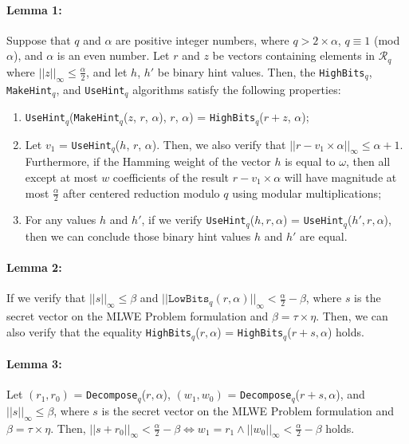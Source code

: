 \documentclass[runningheads]{llncs}
\numberwithin{equation}{section}
\begin{document}
    \paragraph{\textbf{Lemma 1:}} Suppose that $q$ and $\alpha$ are positive integer numbers, where $q > 2 \times \alpha$, $q \equiv 1$ (mod $\alpha$), and $\alpha$ is an even number. Let $r$ and $z$ be vectors containing elements in ${\mathcal{R}}_{q}$ where ${||z||}_{\infty} \leq \frac{\alpha}{2}$, and let $h$, $h'$ be binary hint values. Then, the \texttt{HighBits}${}_{q}$, \texttt{MakeHint}${}_{q}$, and \texttt{UseHint}${}_{q}$ algorithms satisfy the following properties: 
    \begin{enumerate}
        \item \texttt{UseHint}${}_{q}$(\texttt{MakeHint}${}_{q}$($z$, $r$, $\alpha$), $r$, $\alpha$) = \texttt{HighBits}${}_{q}$($r + z$, $\alpha$);
        \item Let ${v}_{1}$ = \texttt{UseHint}${}_{q}$($h$, $r$, $\alpha$). Then, we also verify that ${||r - {v}_{1} \times \alpha||}_{\infty} \leq \alpha + 1$. Furthermore, if the Hamming weight of the vector $h$ is equal to $\omega$, then all except at most $w$ coefficients of the result $r - {v}_{1} \times \alpha$ will have magnitude at most $\frac{\alpha}{2}$ after centered reduction modulo $q$ using modular multiplications;
        \item For any values $h$ and $h'$, if we verify \texttt{UseHint}${}_{q}$($h, r, \alpha$) = \texttt{UseHint}${}_{q}$($h', r, \alpha$), then we can conclude those binary hint values $h$ and $h'$ are equal.
    \end{enumerate}

    \paragraph{\textbf{Lemma 2:}} If we verify that ${||s||}_{\infty} \leq \beta$ and ${||\mathrm{\texttt{LowBits}}{}_{q}(r, \alpha)||}_{\infty} < \frac{\alpha}{2} - \beta$, where $s$ is the secret vector on the MLWE Problem formulation and $\beta = \tau \times \eta$. Then, we can also verify that the equality \texttt{HighBits}${}_{q}$($r, \alpha$) = \texttt{HighBits}${}_{q}$($r + s, \alpha$) holds.

    \paragraph{\textbf{Lemma 3:}} Let $({r}_{1}, {r}_{0})$ = \texttt{Decompose}${}_{q}$($r, \alpha$), $({w}_{1}, {w}_{0})$ = \texttt{Decompose}${}_{q}$($r + s, \alpha$), and ${||s||}_{\infty} \leq \beta$, where $s$ is the secret vector on the MLWE Problem formulation and $\beta = \tau \times \eta$. Then, ${||s + {r}_{0}||}_{\infty} < \frac{\alpha}{2} - \beta \Longleftrightarrow {w}_{1} = {r}_{1} \wedge {||{w}_{0}||}_{\infty} < \frac{\alpha}{2} - \beta$ holds.
\end{document}
